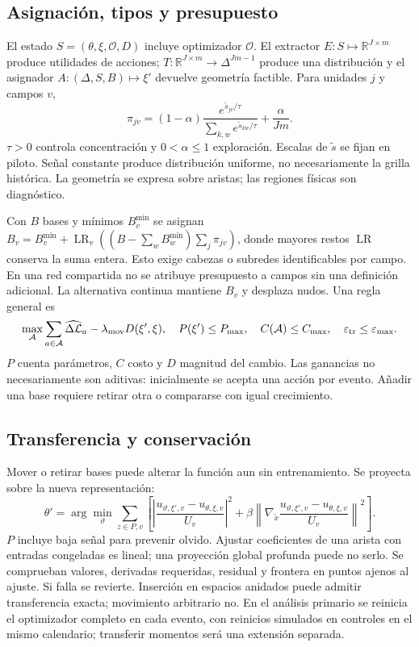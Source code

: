 \subsection{Asignación, tipos y presupuesto}
El estado $S=(\theta,\xi,\mathcal O,D)$ incluye optimizador $\mathcal O$. El extractor $E:S\mapsto\mathbb R^{J\times m}$ produce utilidades de acciones; $T:\mathbb R^{J\times m}\to\Delta^{Jm-1}$ produce una distribución y el asignador $A:(\Delta,S,B)\mapsto\xi'$ devuelve geometría factible. Para unidades $j$ y campos $v$,
\begin{equation}\pi_{jv}=(1-\alpha)\frac{e^{\widetilde s_{jv}/\tau}}{\sum_{k,w}e^{\widetilde s_{kw}/\tau}}+\frac\alpha{Jm}.\label{eq:density}\end{equation}
$\tau>0$ controla concentración y $0<\alpha\leq1$ exploración. Escalas de $\widetilde s$ se fijan en piloto. Señal constante produce distribución uniforme, no necesariamente la grilla histórica. La geometría se expresa sobre aristas; las regiones físicas son diagnóstico.

Con $B$ bases y mínimos $B_v^{\min}$ se asignan $B_v=B_v^{\min}+\operatorname{LR}_v((B-\sum_wB_w^{\min})\sum_j\pi_{jv})$, donde mayores restos $\operatorname{LR}$ conserva la suma entera. Esto exige cabezas o subredes identificables por campo. En una red compartida no se atribuye presupuesto a campos sin una definición adicional. La alternativa continua mantiene $B_v$ y desplaza nudos. Una regla general es
\begin{equation}\max_{\mathcal A}\sum_{a\in\mathcal A}\widehat{\Delta\mathcal L}_a-\lambda_{\rm mov}D(\xi',\xi),\quad P(\xi')\leq P_{\max},\quad C(\mathcal A)\leq C_{\max},\quad\varepsilon_{\rm tr}\leq\varepsilon_{\max}.\end{equation}
$P$ cuenta parámetros, $C$ costo y $D$ magnitud del cambio. Las ganancias no necesariamente son aditivas: inicialmente se acepta una acción por evento. Añadir una base requiere retirar otra o compararse con igual crecimiento.

\subsection{Transferencia y conservación}
Mover o retirar bases puede alterar la función aun sin entrenamiento. Se proyecta sobre la nueva representación:
\begin{equation}
\theta'=\arg\min_{\vartheta}\sum_{z\in P,v}\left[\left|\frac{u_{\vartheta,\xi',v}-u_{\theta,\xi,v}}{U_v}\right|^2+\beta\left\|\nabla_{\widetilde x}\frac{u_{\vartheta,\xi',v}-u_{\theta,\xi,v}}{U_v}\right\|^2\right].\label{eq:transfer}
\end{equation}
$P$ incluye baja señal para prevenir olvido. Ajustar coeficientes de una arista con entradas congeladas es lineal; una proyección global profunda puede no serlo. Se comprueban valores, derivadas requeridas, residual y frontera en puntos ajenos al ajuste. Si falla se revierte. Inserción en espacios anidados puede admitir transferencia exacta; movimiento arbitrario no. En el análisis primario se reinicia el optimizador completo en cada evento, con reinicios simulados en controles en el mismo calendario; transferir momentos será una extensión separada.

